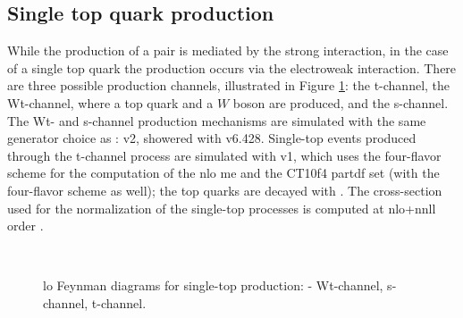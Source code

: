 \subsection{Single top quark production}

While the production of a \ttbar pair is mediated by the strong interaction, in the case of a single top quark the production occurs via the electroweak interaction. 
There are three possible production channels, illustrated in Figure \ref{fig:single_top_prod}: the t-channel, the Wt-channel, where a top quark and a $W$ boson are produced, and the s-channel. 
The Wt- and s-channel production mechanisms are simulated with the same generator choice as \ttbar: \PowhegBox v2, showered with \PY v6.428.
Single-top events produced through the t-channel process are simulated with \PowhegBox v1, which uses the four-flavor scheme for the computation of the \gls{nlo} \gls{me} and the CT10f4 \gls{partdf} set (with the four-flavor scheme as well); 
the top quarks are decayed with \MadSpin \cite{Artoisenet:2012st}.
The cross-section used for the normalization of the single-top processes is computed at \gls{nlo}+\gls{nnll} order 
\cite{Kidonakis:2011wy,Kidonakis:2010ux,Kidonakis:2010tc}.

\begin{figure}[h]
\centering 
{}
 \\
\caption{\Gls{lo} Feynman diagrams for single-top production: - Wt-channel,  
 s-channel,  t-channel.}\label{fig:single_top_prod}
\end{figure}

